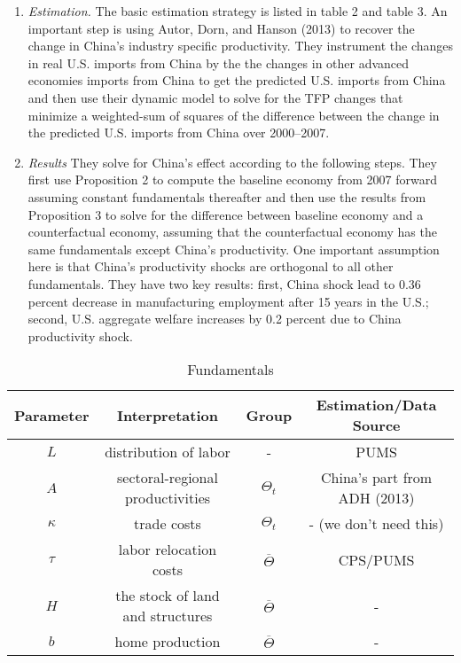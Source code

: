 \documentclass{article}
\begin{document}
\begin{enumerate}
    \item \textit{Estimation. } The basic estimation strategy is listed in table 2 and table 3. An important step is using Autor, Dorn, and Hanson (2013) to recover the change in China's industry specific productivity. 
    They instrument the changes in real U.S. imports from China by the the changes in other advanced economies imports from China to get the predicted U.S. imports from China and then use  their dynamic model to solve for the TFP changes that minimize a weighted-sum of squares of the difference between the change in the predicted U.S. imports from China over 2000–2007.
    
    \item \textit{Results} They solve for China's effect according to the following steps. They first use Proposition 2 to compute the baseline economy from 2007 forward assuming constant fundamentals thereafter and then use the results from Proposition 3 to solve for the difference between  baseline economy and a counterfactual economy, assuming that the counterfactual economy has the same fundamentals except China's productivity. One important assumption here is that China's productivity shocks are orthogonal to all other fundamentals. They have two key results: first, China shock lead to 0.36 percent decrease in manufacturing employment after 15 years in the U.S.; second, U.S. aggregate welfare increases by 0.2 percent due to China productivity shock.
\end{enumerate}

\begin{table}[h!]
\begin{center}
 \begin{tabular}{c |c| c| c} 
 \hline
 Parameter & Interpretation & Group & Estimation/Data Source \\ [0.5ex] 
 \hline\hline
 $L$ & distribution of labor & - & PUMS \\ 
\hline
 $A$ &  sectoral-regional productivities & $\Theta_t$ & China's part from ADH (2013) \\
 \hline
 $\kappa$ & trade costs & $\Theta_t$ & - (we don't need this) \\
 \hline
 $\tau$ &  labor relocation costs  & $\overline{\Theta}$ & CPS/PUMS \\
 \hline
 $H$ & the stock of land and structures  & $\overline{\Theta}$ & - \\ 
 \hline
 $b$ & home production  & $\overline{\Theta}$ & - \\ 
 \hline
\end{tabular}
\end{center}
\caption{Fundamentals}
\label{table:1}
\end{table}
\end{document}
